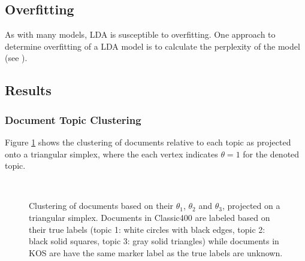 \documentclass[10pt]{article}
\begin{document}
%
%
\subsection{Overfitting}
As with many models, LDA is susceptible to overfitting. One approach to determine overfitting of a LDA model is to calculate the perplexity of the model (see \cite{Heinrich}).


%
%
\subsection{Results}

\subsubsection{Document Topic Clustering}
Figure \ref{fig:cluserting} shows the clustering of documents relative to each topic as projected onto a triangular simplex, where the each vertex indicates $\theta = 1$ for the denoted topic.


\begin{figure}[t]
    \centering
    \mbox{ \quad
        }
    \caption{Clustering of documents based on their $\theta_1$, $\theta_2$ and $\theta_3$, projected on a triangular simplex. Documents in Classic400 are labeled based on their true labels (topic 1: white circles with black edges, topic 2: black solid squares, topic 3: gray solid triangles) while documents in KOS are have the same marker label as the true labels are unknown.}
    \label{fig:cluserting}
\end{figure}
\end{document}
